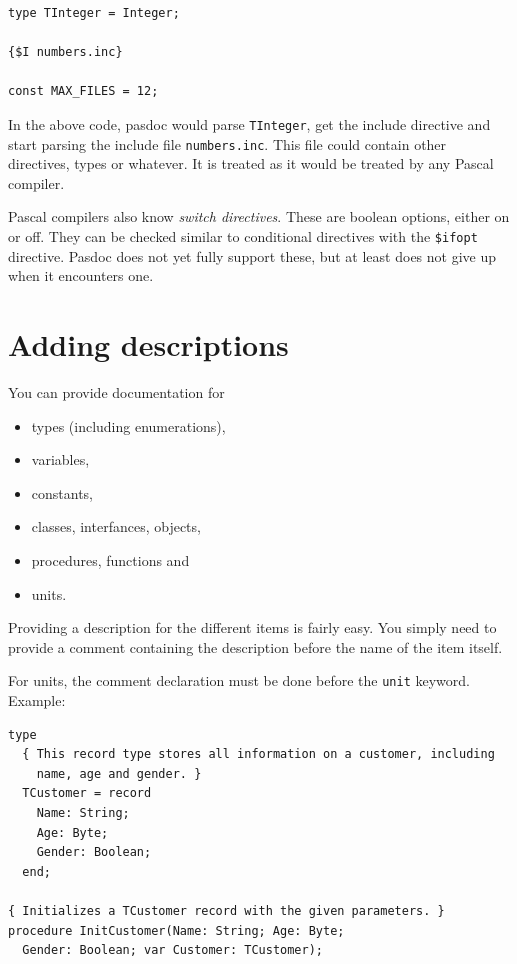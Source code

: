 \documentclass[11pt]{article}
\begin{document}
\begin{verbatim}
type TInteger = Integer;

{$I numbers.inc}

const MAX_FILES = 12;
\end{verbatim}

In the above code, pasdoc would parse {\tt TInteger}, get the include
directive and start parsing the include file {\tt numbers.inc}.
This file could contain other directives, types or whatever.
It is treated as it would be treated by any Pascal compiler.

Pascal compilers also know \emph{switch directives}.
These are boolean options, either on or off.
They can be checked similar to conditional directives with
the {\tt \$ifopt} directive.
Pasdoc does not yet fully support these, but at least does not give
up when it encounters one.

\section{Adding descriptions}

You can provide documentation for

\begin{itemize}
\item types (including enumerations),
\item variables,
\item constants,
\item classes, interfances, objects,
\item procedures, functions and
\item units.
\end{itemize}

Providing a description for the different items is fairly easy. You simply
need to provide a comment containing the description before the name of
the item itself.

For units, the comment declaration must be done before the {\tt unit} keyword.
Example:
\begin{verbatim}
type
  { This record type stores all information on a customer, including
    name, age and gender. }
  TCustomer = record
    Name: String;
    Age: Byte;
    Gender: Boolean;
  end;

{ Initializes a TCustomer record with the given parameters. }
procedure InitCustomer(Name: String; Age: Byte;
  Gender: Boolean; var Customer: TCustomer);
\end{verbatim}
\end{document}

